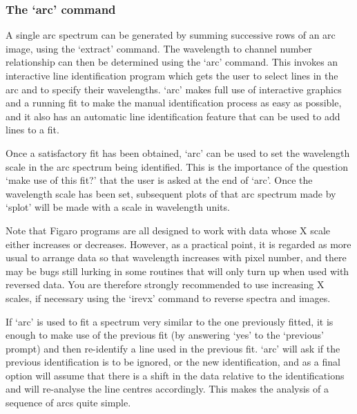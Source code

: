 
\subsubsection{\label{techno8arc}The `arc' command}

   A single arc spectrum can be generated by summing successive rows of
   an arc image, using the `extract' command.  The wavelength to channel
   number relationship can then be determined using the `arc' command.
   This invokes an interactive line identification program which gets
   the user to select lines in the arc and to specify their wavelengths.
   `arc' makes full use of interactive graphics and a running fit to
   make the manual identification process as easy as possible, and it
   also has an automatic line identification feature that can be used to
   add lines to a fit.
   {}

   Once a satisfactory fit has been obtained, `arc' can be used to set
   the wavelength scale in the arc spectrum being identified.  This is
   the importance of the question `make use of this fit?' that the user
   is asked at the end of `arc'.  Once the wavelength scale has been
   set, subsequent plots of that arc spectrum made by `splot' will be
   made with a scale in wavelength units.

   Note that Figaro programs are all designed to work with data whose X
   scale either increases or decreases.  However, as a practical point,
   it is regarded as more usual to arrange data so that wavelength
   increases with pixel number, and there may be bugs still lurking in
   some routines that will only turn up when used with reversed data.
   You are therefore strongly recommended to use increasing X scales, if
   necessary using the `irevx' command to reverse spectra and images.

   If `arc' is used to fit a spectrum very similar to the one previously
   fitted, it is enough to make use of the previous fit (by answering
   `yes' to the `previous' prompt) and then re-identify a line used in
   the previous fit.  `arc' will ask if the previous identification is
   to be ignored, or the new identification, and as a final option will
   assume that there is a shift in the data relative to the
   identifications and will re-analyse the line centres accordingly.
   This makes the analysis of a sequence of arcs quite simple.

